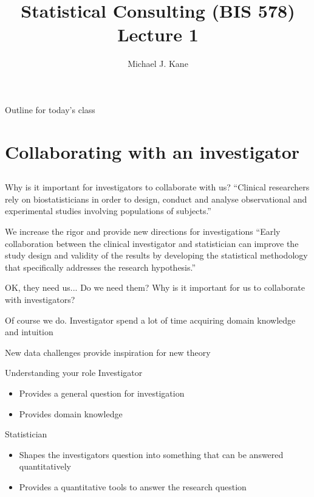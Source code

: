 \documentclass[14pt]{beamer}
\title{Statistical Consulting (BIS 578) Lecture 1}
\author{Michael J. Kane}
\date{}
\begin{document}
\begin{frame}
  \titlepage
\end{frame}

\begin{frame}{Outline for today's class}
  \tableofcontents
\end{frame}

\section{Collaborating with an investigator}

\subsection*{}

\begin{frame}{Why is it important for investigators to collaborate 
with us?}
``Clinical researchers rely on biostatisticians in order to design, conduct and 
analyse observational and experimental studies involving populations of 
subjects.'' \citep{Bangdiwala2001}
\end{frame}

\begin{frame}{We increase the rigor and provide new directions
for investigations}
``Early collaboration between the clinical investigator and statistician can 
improve the study design and validity of the results by developing the 
statistical methodology that specifically addresses the research hypothesis.''
\cite{Adams2009}
\end{frame}

\begin{frame}{OK, they need us...  Do we need them?}
Why is it important for us to collaborate with investigators?
\end{frame}

\begin{frame}{Of course we do.}
Investigator spend a lot of time acquiring domain knowledge and intuition

\vspace{0.5cm}

New data challenges provide inspiration for new theory
\end{frame}

\begin{frame}{Understanding your role}
Investigator
\begin{itemize}
\item Provides a general question for investigation
\item Provides domain knowledge
\end{itemize}
Statistician
\begin{itemize}
\item Shapes the investigators question into something that can be answered
  quantitatively
\item Provides a quantitative tools to answer the research question
\end{itemize}
\end{frame}
\end{document}
